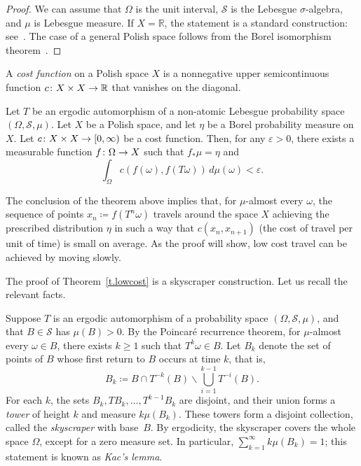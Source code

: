 \documentclass[AHL,Unicode,longabstracts,published]{cedram}
\newcommand{\R}{\mathbb{R}}
\newcommand{\clS}{\mathcal{S}}
\renewcommand{\epsilon}{\varepsilon}
\renewcommand{\setminus}{\smallsetminus}
\renewcommand*{\to}{\mathchoice{\longrightarrow}{\rightarrow}{\rightarrow}{\rightarrow}}
\newcommand*{\MK}{\mkern 2mu}
\newcommand{\R}{\mathbb{R}}
\begin{document}
\begin{proof}
We can assume that $\Omega$ is the unit interval, $\clS$ is the Lebesgue $\sigma$-algebra, and $\mu$ is Lebesgue measure. If $X = \R$, the statement is a standard construction: see~\cite[p.~429, Proposition~2$\MK$(2)]{Embrechts}. The case of a general Polish space follows from the Borel isomorphism theorem~\cite[p.~99]{Srivastava}.
\end{proof}


A \emph{cost function} on a Polish space $X$ is a nonnegative upper semicontinuous function $c \colon X \times X \to \R$ that vanishes on the diagonal.

\begin{theo}\label{t.lowcost}
Let $T$ be an ergodic automorphism of a non-atomic Lebesgue probability space $(\Omega,\clS,\mu)$. Let $X$ be a Polish space, and let $\eta$ be a Borel probability measure on $X$. Let $c \colon X \times X \to [0,\infty)$ be a cost function. Then, for any $\epsilon>0$, there exists a measurable function $f \colon \Omega \to X$ such that $f_* \mu = \eta$ and
\begin{equation}\label{e.lowcost}
\int_\Omega c(f(\omega),f(T \omega)) \, d\mu(\omega) < \epsilon.
\end{equation}
\end{theo}

The conclusion of the theorem above implies that, for $\mu$-almost every $\omega$, the sequence of points $x_n \coloneqq f(T^n \omega)$ travels around the space $X$ achieving the prescribed distribution $\eta$ in such a way that $c(x_n,x_{n+1})$ (the cost of travel per unit of time) is small on average. As the proof will show, low cost travel can be achieved by moving slowly.

The proof of Theorem~\ref{t.lowcost} is a skyscraper construction. Let us recall the relevant facts.

Suppose $T$ is an ergodic automorphism of a probability space $(\Omega,\clS,\mu)$, and that $B \in \clS$ has $\mu(B)>0$. By the Poincaré recurrence theorem, for $\mu$-almost every $\omega \in B$, there exists $k \ge 1$ such that $T^k \omega \in B$. Let $B_k$ denote the set of points of $B$ whose first return to $B$ occurs at time $k$, that is,
\begin{equation}\label{e.Bk}
B_k \coloneqq B \cap T^{-k}(B) \setminus \bigcup_{i=1}^{k-1} T^{-i}(B).
\end{equation}
For each $k$, the sets $B_k, TB_k, \dots, T^{k-1} B_k$ are disjoint, and their union forms a \emph{tower} of height $k$ and measure $k \mu(B_k)$. These towers form a disjoint collection, called the \emph{skyscraper} with base~$B$. By ergodicity, the skyscraper covers the whole space $\Omega$, except for a zero measure set. In particular, $\sum_{k=1}^\infty k \mu(B_k) = 1$; this statement is known as \emph{Kac's lemma}.
\end{document}
